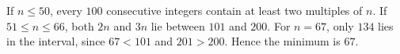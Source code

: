 If $n\le50$, every $100$ consecutive integers contain at least two multiples of $n$. If $51\le n\le66$, both $2n$ and $3n$ lie between $101$ and $200$. For $n=67$, only $134$ lies in the interval, since $67<101$ and $201>200$. Hence the minimum is $\boxed{67}$.
